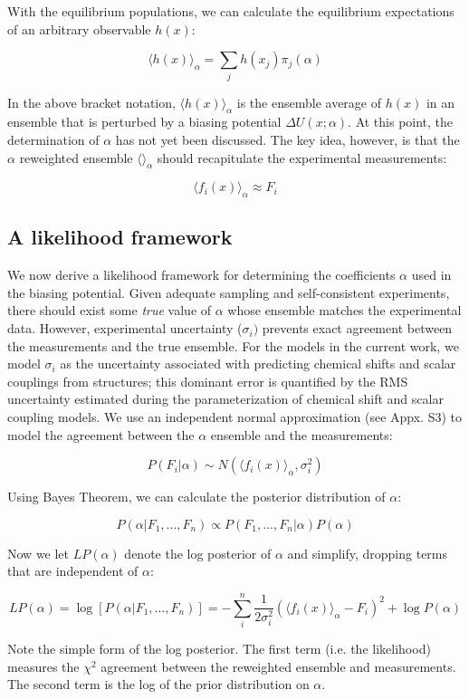 \documentclass[11pt,titlepage]{article}
\begin{document}
With the equilibrium populations, we can calculate the equilibrium expectations of an arbitrary observable $h(x)$:

$$\langle h(x)\rangle _\alpha = \sum_j h(x_j) \pi_j(\alpha)$$

In the above bracket notation, $\langle h(x)\rangle _\alpha$ is the ensemble average of $h(x)$ in an ensemble that is perturbed by a biasing potential $\Delta U(x;\alpha)$.  At this point, the determination of $\alpha$ has not yet been discussed.  The key idea, however, is that the $\alpha$ reweighted ensemble $\langle \rangle _\alpha$ should recapitulate the experimental measurements:

$$\langle f_i(x)\rangle _\alpha \approx F_i$$


\subsection*{A likelihood framework}

We now derive a likelihood framework for determining the coefficients $\alpha$ used in the biasing potential.  Given adequate sampling and self-consistent experiments, there should exist some \emph{true} value of $\alpha$ whose ensemble matches the experimental data.  However, experimental uncertainty ($\sigma_i)$ prevents exact agreement between the measurements and the true ensemble.  For the models in the current work, we model $\sigma_i$ as the uncertainty associated with predicting chemical shifts and scalar couplings from structures; this dominant error is quantified by the RMS uncertainty estimated during the parameterization of chemical shift and scalar coupling models.  We use an independent normal approximation (see Appx. S3) to model the agreement between the $\alpha$ ensemble and the measurements:

$$P(F_i | \alpha) \sim N(\langle f_i(x)\rangle _\alpha, \sigma_i^2)$$

Using Bayes Theorem, we can calculate the posterior distribution of $\alpha$:

$$P(\alpha | F_1, ..., F_n) \propto P(F_1, ..., F_n | \alpha) P(\alpha)$$

Now we let $LP(\alpha)$ denote the log posterior of $\alpha$ and simplify, dropping terms that are independent of $\alpha$:

$$LP(\alpha) = \log[ P(\alpha|F_1, ..., F_n)] = -\sum_i^n \frac{1}{2\sigma_i^2}(\langle f_i(x)\rangle _\alpha - F_i)^2 + \log P(\alpha)$$

Note the simple form of the log posterior.  The first term (i.e. the likelihood) measures the $\chi^2$ agreement between the reweighted ensemble and measurements.  The second term is the log of the prior distribution on $\alpha$.  
\end{document}
